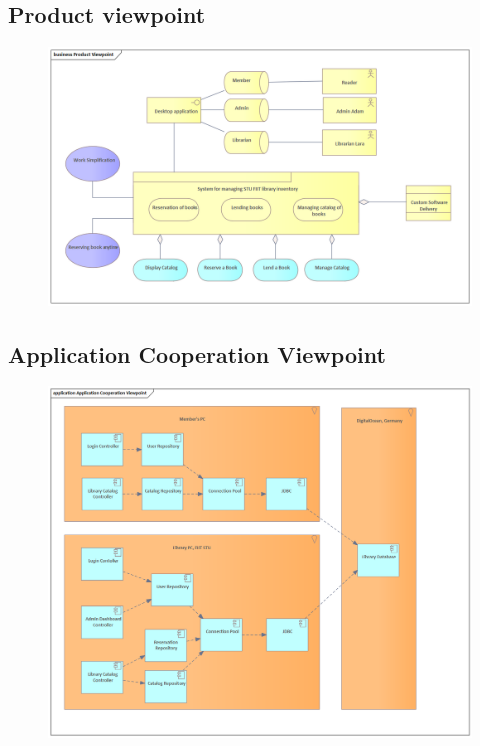 \documentclass[11pt,twoside,a4paper]{article}
\begin{document}
\pagebreak
\subsection{Product viewpoint}
\begin{figure}[!ht]
    \includegraphics[scale=.7]{../ea/Product Viewpoint.png}
    \centering
\end{figure}

\pagebreak
\subsection{Application Cooperation Viewpoint}
\begin{figure}[!ht]
    \includegraphics[scale=.6]{../ea/Application Cooperation Viewpoint.png}
    \centering
\end{figure}
\end{document}
